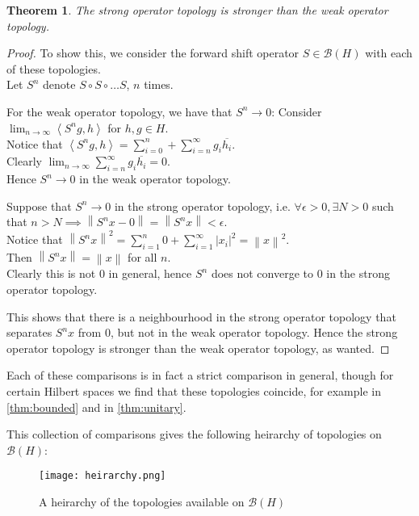 \documentclass{article}
\theoremstyle{plain}
\newtheorem{theorem}{Theorem}
\theoremstyle{definition}
\newcommand{\abs}[1]{\left\lvert #1 \right\rvert}
\newcommand{\inner}[2]{\left\langle #1, #2 \right\rangle}
\newcommand{\norm}[1]{\left\lVert #1 \right\rVert}
\newcommand{\BH}{\cal{B}(H)}
\renewcommand{\cal}[1]{\mathcal{#1}}
\begin{document}
                \begin{theorem}
                        The strong operator topology is stronger than the weak operator topology.
                \end{theorem}
                \begin{proof}
                        To show this, we consider the forward shift operator $S \in \BH$ with each of these topologies.\\
                        Let $S^n$ denote $S \circ S \circ \dots S$, $n$ times.

                        For the weak operator topology, we have that $S^n \to 0$:
                        Consider $\lim_{n\to\infty} \inner{S^ng}{h}$ for $h, g \in H$.\\
                        Notice that $\inner{S^n g}{h} = \sum_{i=0}^n + \sum_{i=n}^\infty g_i \overline{h_i}$.\\
                        Clearly $\lim_{n\to\infty} \sum_{i=n}^\infty g_i \overline{h_i} = 0$.\\
                        Hence $S^n \to 0$ in the weak operator topology.

                        Suppose that $S^n \to 0$ in the strong operator topology, i.e. $\forall \epsilon > 0, \exists N > 0$ such that $n > N \implies \norm{S^nx - 0} = \norm{S^n x} < \epsilon$.\\
                        Notice that $\norm{S^n x}^2 = \sum_{i=1}^n 0 + \sum_{i=1}^\infty \abs{x_i}^2 = \norm{x}^2$.\\
                        Then $\norm{S^n x} = \norm{x}$ for all $n$.\\
                        Clearly this is not $0$ in general, hence $S^n$ does not converge to 0 in the strong operator topology.

                        This shows that there is a neighbourhood in the strong operator topology that separates $S^n x$ from 0, but not in the weak operator topology. Hence the strong operator topology is stronger than the weak operator topology, as wanted.
                \end{proof}

                Each of these comparisons is in fact a strict comparison in general, though for certain Hilbert spaces we find that these topologies coincide, for example in \cref{thm:bounded} and in \cref{thm:unitary}.

                This collection of comparisons gives the following heirarchy of topologies on $\BH$:
                \begin{figure}[H]
                        \centering
                        \texttt{[image: heirarchy.png]}
                        \caption{A heirarchy of the topologies available on $\BH$}
                        \label{fig:heirarchy}
                        \cite{heirarchy}
                \end{figure}
\end{document}
